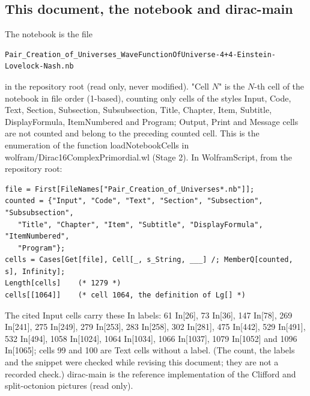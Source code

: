 \documentclass[11pt]{article}
\begin{document}
\subsection{This document, the notebook and dirac-main}

The notebook is the file

\begin{Verbatim}[fontsize=\small]
Pair_Creation_of_Universes_WaveFunctionOfUniverse-4+4-Einstein-Lovelock-Nash.nb
\end{Verbatim}

in the repository root (read only, never modified). "Cell $N$" is the $N$-th cell of the notebook in file order (1-based), counting only cells of the styles Input, Code, Text, Section, Subsection, Subsubsection, Title, Chapter, Item, Subtitle, DisplayFormula, ItemNumbered and Program; Output, Print and Message cells are not counted and belong to the preceding counted cell. This is the enumeration of the function loadNotebookCells in wolfram/Dirac16ComplexPrimordial.wl (Stage 2). In WolframScript, from the repository root:

\begin{Verbatim}[fontsize=\small]
file = First[FileNames["Pair_Creation_of_Universes*.nb"]];
counted = {"Input", "Code", "Text", "Section", "Subsection", "Subsubsection",
   "Title", "Chapter", "Item", "Subtitle", "DisplayFormula", "ItemNumbered",
   "Program"};
cells = Cases[Get[file], Cell[_, s_String, ___] /; MemberQ[counted, s], Infinity];
Length[cells]    (* 1279 *)
cells[[1064]]    (* cell 1064, the definition of Lg[] *)
\end{Verbatim}

The cited Input cells carry these In labels: 61 In[26], 73 In[36], 147 In[78], 269 In[241], 275 In[249], 279 In[253], 283 In[258], 302 In[281], 475 In[442], 529 In[491], 532 In[494], 1058 In[1024], 1064 In[1034], 1066 In[1037], 1079 In[1052] and 1096 In[1065]; cells 99 and 100 are Text cells without a label. (The count, the labels and the snippet were checked while revising this document; they are not a recorded check.) dirac-main is the reference implementation of the Clifford and split-octonion pictures (read only).
\end{document}
